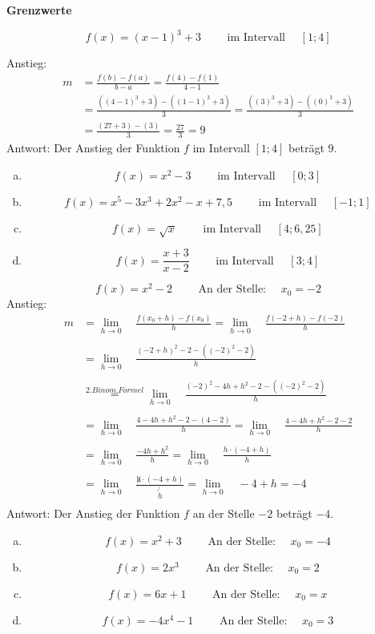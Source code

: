 \documentclass[a4paper,12pt]{article}
\newcommand{\Uebungsblatt}{ Grenzwerte}
\newcommand{\limesh}[1]{
	\lim\limits_{h\rightarrow 0}\quad  #1
}
\newcommand{\Aufgabe}[2]{
	{
		\vspace*{0.3cm}
		\begin{tcolorbox}[breakable,colback=yellow!0,colframe=black!65!black,title=\textbf{Aufgabe #1:},width=\linewidth ]
			{#2}
		\end{tcolorbox}
		
		
	}
}
\newcommand{\Beispiel}[1]{
	\vspace*{0.3cm}
	\begin{tcolorbox}[breakable,colback=yellow!0,colframe=green!65!black,title=\textbf{Beispiel:},width=\linewidth ]
		{#1}
	\end{tcolorbox}
}
\newcommand{\abc}[1]{
	\begin{enumerate}[(a)]
		#1
	\end{enumerate}
}
\begin{document}
	\thispagestyle{fancy}
	\begin{center}
		\LARGE \sf \textbf{ \Uebungsblatt{}}
	\end{center}
	\vspace*{0.1cm}
	
	\Aufgabe{1 (Differentenquotient)}{
		\Beispiel{
			 \[f(x)=(x-1)^3 + 3 \qquad \text{ im Intervall }\quad [1;4]\]
			 
			 Anstieg: \begin{align*}
			 	m&= \frac{f(b)-f(a)}{b-a}=\frac{f(4)-f(1)}{4-1}\\
			 	&= \frac{((4-1)^3 + 3)-((1-1)^3 + 3)}{3}=\frac{((3)^3 + 3)-((0)^3 + 3)}{3}\\
			 	&=\frac{(27 + 3)-(3)}{3}=\frac{27}{3}=9
			 \end{align*}
		 Antwort: Der Anstieg der Funktion $f$ im Intervall $[1;4]$ beträgt $9$.
		}
		\vspace{1cm}
		\abc{
			\item \[f(x)=x^2 - 3 \qquad \text{ im Intervall }\quad [0;3]\]
			\item \[f(x)=x^5-3x^3 + 2x^2 -x + 7,5  \qquad \text{ im Intervall }\quad [-1;1]\]
			\item \[f(x)=\sqrt{x} \qquad \text{ im Intervall }\quad [4;6,25]\]
			\item \[f(x)=\frac{x+3}{x-2} \qquad \text{ im Intervall }\quad [3;4]\]
		}
	}
\newpage
	\Aufgabe{2 (Differentialquotient)}{
		\Beispiel{
			\[f(x)=x^2 -2 \qquad \text{ An der Stelle: }\quad x_0=-2\]
			Anstieg:
			\begin{align*}
				m&=\limesh{\frac{f(x_0 + h)-f(x_0)}{h}}=\limesh{\frac{f(-2 + h)-f(-2)}{h}}\\\\
				&= \limesh{\frac{(-2+h)^2 -2 -((-2)^2 - 2)}{h}}\\\\ &\overset{2. Binom. Formel}{=} \limesh{\frac{(-2)^2 -4h + h^2 -2 -((-2)^2 - 2)}{h}}\\\\
				&= \limesh{\frac{4 -4h + h^2 -2 -(4 - 2)}{h}} = \limesh{\frac{4 -4h + h^2 -2 -2}{h}}\\\\
				&= \limesh{\frac{ -4h + h^2 }{h}} = \limesh{\frac{ h\cdot(-4 + h) }{h}}\\\\
				&= \limesh{\frac{ \not h \cdot(-4 + h) }{\not{h}}} = \limesh{-4 + h}= -4\\
			\end{align*}
		Antwort: Der Anstieg der Funktion $f$ an der Stelle $-2$ beträgt $-4$.
			}
		\abc{
			\item \[f(x)=x^2 + 3 \qquad \text{ An der Stelle: }\quad x_0=-4\]
			\item \[f(x)=2x^3 \qquad \text{ An der Stelle: }\quad x_0=2\]
			\item \[f(x)=6x+1 \qquad \text{ An der Stelle: }\quad x_0=x\]
			\item \[f(x)=-4x^4-1 \qquad \text{ An der Stelle: }\quad x_0=3\]
		}
	}
\end{document}
